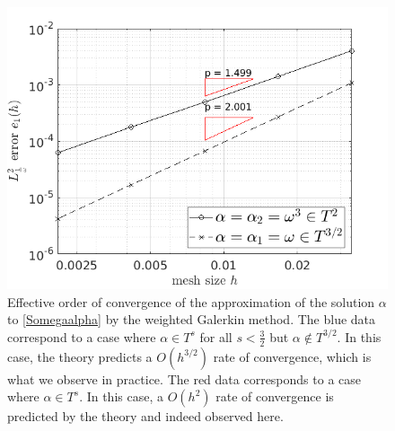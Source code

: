 \documentclass[a4paper]{subfiles}
\begin{document}
\begin{figure}[H]
	\centering
	\hspace{-1cm}\includegraphics[scale = 0.4]{OpenArc/figs/ordreCVDir}
	\caption{Effective order of convergence of the approximation of the solution $\alpha$ to \eqref{Somegaalpha} by the weighted Galerkin method. The blue data correspond to a case where $\alpha \in T^{s}$ for all $s < \frac{3}{2}$ but $\alpha \notin T^{3/2}$. In this case, the theory predicts a $O(h^{3/2})$ rate of convergence, which is what we observe in practice. The red data corresponds to a case where $\alpha \in T^s$. In this case, a $O(h^2)$ rate of convergence is predicted by the theory and indeed observed here.} 
	\label{fig:errL2dir}
\end{figure}
\end{document}
